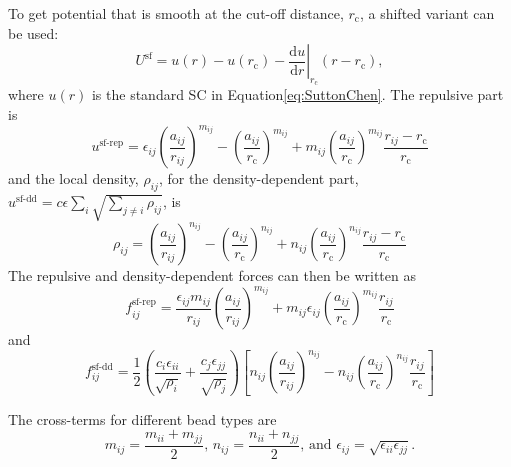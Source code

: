 To get potential that is smooth at the cut-off distance, $r_\text{c}$, a
shifted variant can be used:
\begin{equation}
U^\text{sf}=u(r)-u(r_\text{c})
  -\left.\frac{\text{d}u}{\text{d}r}\right|_{r_\text{c}}(r-r_\text{c}),
\end{equation}
where $u(r)$ is the standard SC in Equation\eqref{eq:SuttonChen}. The repulsive
part is
\begin{equation}
u^\text{sf-rep} = \epsilon_{ij}\left(\frac{a_{ij}}{r_{ij}}\right)^{m_{ij}}
  -\left(\frac{a_{ij}}{r_\text{c}}\right)^{m_{ij}}
  +m_{ij}\left(\frac{a_{ij}}{r_\text{c}}\right)^{m_{ij}}\frac{r_{ij}-r_\text{c}}{r_\text{c}}
\end{equation}
and the local density, $\rho_{ij}$, for the density-dependent part,
$u^\text{sf-dd}=c\epsilon\sum_i\sqrt{\sum_{j\neq i}\rho_{ij}}$, is
\begin{equation}
\rho_{ij} = \left(\frac{a_{ij}}{r_{ij}}\right)^{n_{ij}}
  -\left(\frac{a_{ij}}{r_\text{c}}\right)^{n_{ij}}
  +n_{ij}\left(\frac{a_{ij}}{r_\text{c}}\right)^{n_{ij}}\frac{r_{ij}-r_\text{c}}{r_\text{c}}
\end{equation}
The repulsive and density-dependent forces can then be written as
\begin{equation}
f^\text{sf-rep}_{ij} =
  \frac{\epsilon_{ij}m_{ij}}{r_{ij}}\left(\frac{a_{ij}}{r_{ij}}\right)^{m_{ij}}
  +m_{ij}\epsilon_{ij}\left(\frac{a_{ij}}{r_\text{c}}\right)^{m_{ij}}\frac{r_{ij}}{r_\text{c}}
\end{equation}
and
\begin{equation}
f^\text{sf-dd}_{ij} = 
  \frac{1}{2}\left(\frac{c_i\epsilon_{ii}}{\sqrt{\rho_i}}+\frac{c_j\epsilon_{jj}}{\sqrt{\rho_j}}\right)
\left[n_{ij}\left(\frac{a_{ij}}{r_{ij}}\right)^{n_{ij}}
-n_{ij}\left(\frac{a_{ij}}{r_\text{c}}\right)^{n_{ij}}\frac{r_{ij}}{r_\text{c}}\right]
\end{equation}

The cross-terms for different bead types are
\begin{equation}
  m_{ij} = \frac{m_{ii} + m_{jj}}{2}\text{, }
  n_{ij} = \frac{n_{ii} + n_{jj}}{2}\text{, and }
  \epsilon_{ij} = \sqrt{\epsilon_{ii}\epsilon_{jj}}.
\end{equation}

